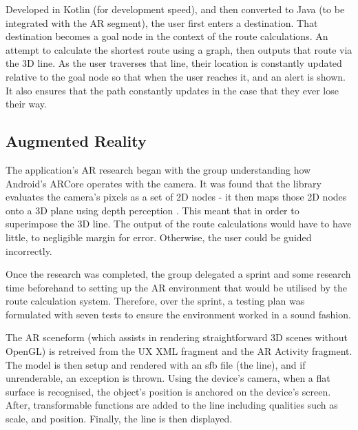Developed in Kotlin (for development speed), and then converted to Java (to be integrated with the AR segment), the user first enters a destination. That destination becomes a goal node in the context of the route calculations. An attempt to calculate the shortest route using a graph, then outputs that route via the 3D line. As the user traverses that line, their location is constantly updated relative to the goal node so that when the user reaches it, and an alert is shown. It also ensures that the path constantly updates in the case that they ever lose their way.

\subsection{Augmented Reality}
The application's AR research began with the group understanding how Android's ARCore operates with the camera. It was found that the library evaluates the camera's pixels as a set of 2D nodes - it then maps those 2D nodes onto a 3D plane using depth perception \cite{}. This meant that in order to superimpose the 3D line. The output of the route calculations would have to have little, to negligible margin for error. Otherwise, the user could be guided incorrectly.

Once the research was completed, the group delegated a sprint and some research time beforehand to setting up the AR environment that would be utilised by the route calculation system. Therefore, over the sprint, a testing plan was formulated with seven tests to ensure the environment worked in a sound fashion.



The AR sceneform (which assists in rendering straightforward 3D scenes without OpenGL) is retreived from the UX XML fragment and the AR Activity fragment. The model is then setup and rendered with an sfb file (the line), and if unrenderable, an exception is thrown. Using the device's camera, when a flat surface is recognised, the object's position is anchored on the device's screen. After, transformable functions are added to the line including qualities such as scale, and position. Finally, the line is then displayed.




